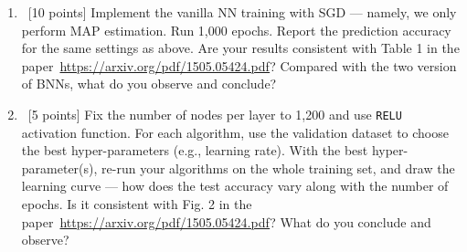 \documentclass[12pt, fullpage,letterpaper]{article}
\begin{document}
\begin{enumerate}
\begin{enumerate}
		\item~[10 points] Implement the vanilla NN training with SGD --- namely, we only perform MAP estimation. Run 1,000 epochs. Report the prediction accuracy for the same settings as above. Are your results consistent with Table 1 in the paper~\url{https://arxiv.org/pdf/1505.05424.pdf}? Compared with the two version of BNNs, what do you observe and conclude? 
		
		\item~[5 points] Fix the number of nodes per layer to 1,200 and use \texttt{RELU} activation function. For each algorithm, use the validation dataset to choose the best hyper-parameters (e.g., learning rate). With the best hyper-parameter(s), re-run your algorithms on the whole training set, and draw the learning curve --- how does the test accuracy vary along with the number of epochs. Is it consistent with Fig. 2 in the paper~\url{https://arxiv.org/pdf/1505.05424.pdf}? What do you conclude and observe?
	\end{enumerate}

\end{enumerate}
\end{document}
